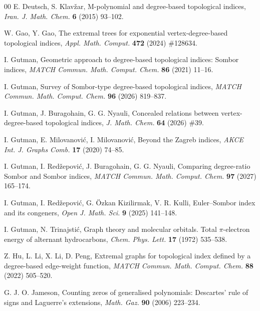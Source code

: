 \documentclass[a5paper, 10pt]{article}
\theoremstyle{plain}
\theoremstyle{remark}
\theoremstyle{definition}
\begin{document}
\begin{thebibliography}{00}
   E. Deutsch, S. Klav\v{z}ar, M-polynomial and
  degree-based topological indices, \textit{Iran. J. Math. Chem.\/} \textbf{6}
  (2015) 93--102.

   W. Gao, Y. Gao, The extremal trees for
  exponential vertex-degree-based topological indices, \textit{Appl.
  Math. Comput.\/} \textbf{472} (2024) \#128634.

   I. Gutman, Geometric approach to degree-based
  topological indices: Sombor indices, \textit{MATCH Commun. Math. Comput.
  Chem.\/} \textbf{86} (2021) 11--16.

   I. Gutman, Survey of Sombor-type
  degree-based topological indices, \textit{MATCH Commun. Math. Comput.
  Chem.\/} \textbf{96} (2026) 819--837.

   I. Gutman, J. Buragohain,
  G. G. Nyauli, Concealed relations between vertex-degree-based
  topological indices, \textit{J. Math. Chem.\/} \textbf{64} (2026) \#39.

   I. Gutman, E. Milovanovi\'c,
  I. Milovanovi\'c, Beyond the Zagreb indices, \textit{AKCE Int. J.
  Graphs Comb.\/} \textbf{17} (2020) 74--85.

   I. Gutman, I. Red\v{z}epovi\'c,
  J. Buragohain, G. G. Nyauli, Comparing degree-ratio Sombor and Sombor indices,
  \textit{MATCH Commun. Math. Comput. Chem.\/} \textbf{97} (2027) 165--174.

   I. Gutman, I. Red\v{z}epovi\'c,
  G. \"Ozkan Kizilirmak, V. R. Kulli, Euler--Sombor index and its congeners,
  \textit{Open J. Math. Sci.\/} \textbf{9} (2025) 141--148.

   I. Gutman, N. Trinajsti\'c, Graph theory
  and molecular orbitals. Total $\pi$-electron energy of alternant
  hydrocarbons, \textit{Chem. Phys. Lett.\/} \textbf{17} (1972) 535--538.

   Z. Hu, L. Li, X. Li, D. Peng, Extremal graphs
  for topological index defined by a degree-based edge-weight
  function, \textit{MATCH Commun. Math. Comput. Chem.\/} \textbf{88}
  (2022) 505--520.

   G. J. O. Jameson, Counting zeros of generalised
  polynomials: Descartes' rule of signs and Laguerre's extensions,
  \textit{Math. Gaz.\/} \textbf{90} (2006) 223--234.


\end{thebibliography}
\end{document}
